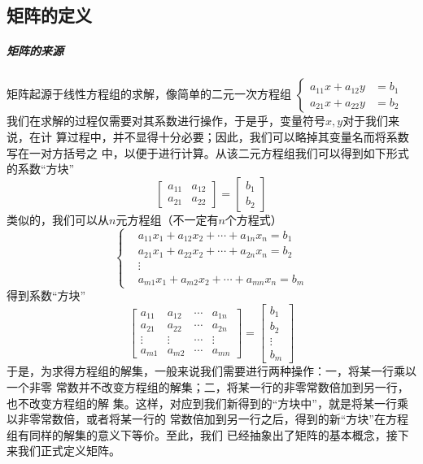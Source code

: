 \documentclass[a4paper,12pt]{ctexart}
\begin{document}
	\subsection{矩阵的定义}
		\subparagraph{矩阵的来源}
		矩阵起源于线性方程组的求解，像简单的二元一次方程组
		$
		\left\{
		\begin{array}{rl}
		a_{11}x + a_{12}y &= b_1\\
		a_{21}x + a_{22}y &= b_2
		\end{array}
		\right.
		$
		我们在求解的过程仅需要对其系数进行操作，于是乎，变量符号$x,y$对于我们来说，在计
		算过程中，并不显得十分必要；因此，我们可以略掉其变量名而将系数写在一对方括号之
		中，以便于进行计算。从该二元方程组我们可以得到如下形式的系数“方块”
		$$
		\left[
		\begin{array}{rl}
		a_{11} & a_{12}\\
		a_{21} & a_{22}
		\end{array}
		\right]
		=
		\left[
		\begin{array}{rl}
		b_1\\
		b_2
		\end{array}
		\right]
		$$
		类似的，我们可以从$n$元方程组（不一定有$n$个方程式）
		$$
		\left\{
		\begin{array}{rl}
		&a_{11}x_1 + a_{12}x_2 + \cdots + a_{1n}x_n = b_1\\
		&a_{21}x_1 + a_{22}x_2 + \cdots + a_{2n}x_n = b_2\\
		&\vdots \\
		&a_{m1}x_1 + a_{m2}x_2 + \cdots + a_{mn}x_n =b_m
		\end{array}
		\right.
		$$
		得到系数“方块”
		$$
		\left[
		\begin{array}{cccc}
		a_{11} & a_{12} & \cdots & a_{1n}\\
		a_{21} & a_{22} & \cdots & a_{2n}\\
		\vdots & \vdots & \cdots & \vdots\\
		a_{m1} & a_{m2} & \cdots & a_{mn}
		\end{array}
		\right]
		=
		\left[
		\begin{array}{rl}
		b_1\\
		b_2\\
		\vdots \\
		b_m
		\end{array}
		\right]
		$$
		于是，为求得方程组的解集，一般来说我们需要进行两种操作：一，将某一行乘以一个非零
		常数并不改变方程组的解集；二，将某一行的非零常数倍加到另一行，也不改变方程组的解
		集。这样，对应到我们新得到的“方块中”，就是将某一行乘以非零常数倍，或者将某一行的
		常数倍加到另一行之后，得到的新“方块”在方程组有同样的解集的意义下等价。至此，我们
		已经抽象出了矩阵的基本概念，接下来我们正式定义矩阵。
		
\end{document}
